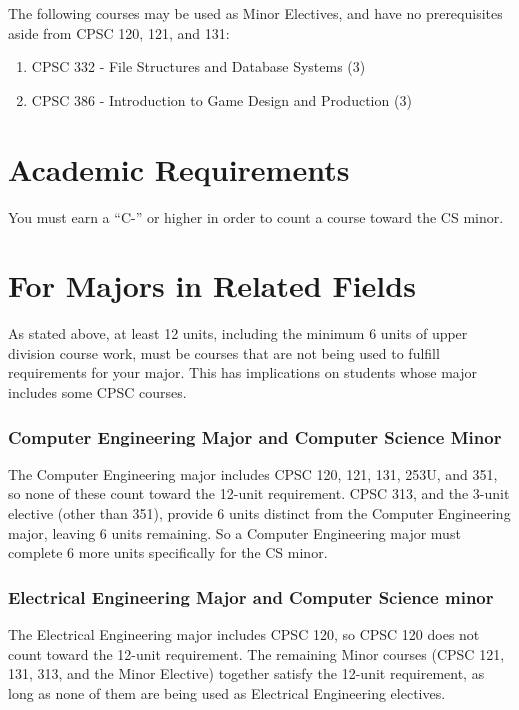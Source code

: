 \documentclass{book}
\begin{document}
The following courses may be used as Minor Electives, and have no prerequisites aside from CPSC 120, 121, and 131:
\begin{enumerate}
\item CPSC 332 - File Structures and Database Systems (3)
\item CPSC 386 - Introduction to Game Design and Production (3)
\end{enumerate}

\section{Academic Requirements}

You must earn a ``C-'' or higher in order to count a course toward the CS minor.

\section{For Majors in Related Fields}

As stated above, at least 12 units, including the minimum 6 units of upper division course work, must be courses that are not being used to fulfill requirements for your major. This has implications on students whose major includes some CPSC courses.

\subsubsection{Computer Engineering Major and Computer Science Minor}

The Computer Engineering major includes CPSC 120, 121, 131, 253U, and 351, so none of these count toward the 12-unit requirement. CPSC 313, and the 3-unit elective (other than 351), provide 6 units distinct from the Computer Engineering major, leaving 6 units remaining. So a Computer Engineering major must complete 6 more units specifically for the CS minor.

\subsubsection{Electrical Engineering Major and Computer Science minor}

The Electrical Engineering major includes CPSC 120, so CPSC 120 does not count toward the 12-unit requirement. The remaining Minor courses (CPSC 121, 131, 313, and the Minor Elective) together satisfy the 12-unit requirement, as long as none of them are being used as Electrical Engineering electives.
\end{document}
